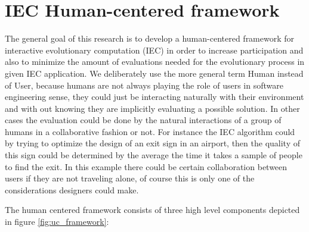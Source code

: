\documentclass[conference]{IEEEtran}
\begin{document}

 \section{IEC Human-centered framework}
\label{sec:graph}
The general goal of this research is to develop a human-centered \cite{gasson2003human} framework
for interactive evolutionary computation (IEC) in order to increase
participation and also to minimize the amount of evaluations needed for the
evolutionary process in given IEC application. We deliberately use the 
more general
term Human instead of User, because humans are not always playing the role of
users in software engineering sense, they could just be interacting 
naturally with their environment and with out knowing they are implicitly
evaluating a possible solution. In other cases the evaluation could be done
by the natural interactions of a group of humans in a collaborative fashion
or not. For instance the IEC algorithm could by trying to optimize 
the design of an exit sign in an airport, then the quality of this sign could be
determined by the average the time it takes a sample of people to 
find the exit. In this example there could be certain collaboration
between users if they are not traveling alone, of course this is only one of
the considerations designers could make. 


The human centered framework consists of three high level components depicted
in figure \ref{fig:uc_framework}:
\end{document}
